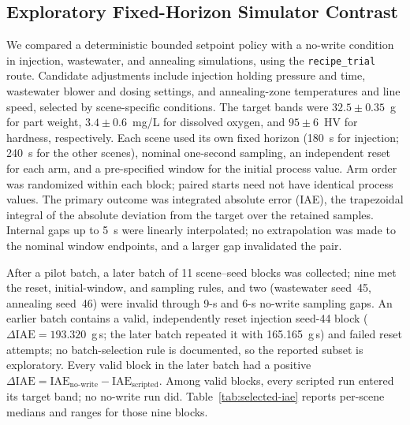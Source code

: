 \subsection{Exploratory Fixed-Horizon Simulator Contrast}
\label{sec:eval-optimization}
We compared a deterministic bounded setpoint policy with a no-write condition in injection, wastewater, and annealing simulations, using the \texttt{recipe\_trial} route. Candidate adjustments include injection holding pressure and time, wastewater blower and dosing settings, and annealing-zone temperatures and line speed, selected by scene-specific conditions. The target bands were $32.5\pm0.35$~g for part weight, $3.4\pm0.6$~mg/L for dissolved oxygen, and $95\pm6$~HV for hardness, respectively. Each scene used its own fixed horizon (180~s for injection; 240~s for the other scenes), nominal one-second sampling, an independent reset for each arm, and a pre-specified window for the initial process value. Arm order was randomized within each block; paired starts need not have identical process values. The primary outcome was integrated absolute error (IAE), the trapezoidal integral of the absolute deviation from the target over the retained samples. Internal gaps up to 5~s were linearly interpolated; no extrapolation was made to the nominal window endpoints, and a larger gap invalidated the pair.

After a pilot batch, a later batch of 11 scene--seed blocks was collected; nine met the reset, initial-window, and sampling rules, and two (wastewater seed~45, annealing seed~46) were invalid through 9-s and 6-s no-write sampling gaps. An earlier batch contains a valid, independently reset injection seed-44 block ($\Delta\mathrm{IAE}=193.320$~g\,s; the later batch repeated it with 165.165~g\,s) and failed reset attempts; no batch-selection rule is documented, so the reported subset is exploratory. Every valid block in the later batch had a positive $\Delta\mathrm{IAE}=\mathrm{IAE}_{\mathrm{no\text{-}write}}-\mathrm{IAE}_{\mathrm{scripted}}$. Among valid blocks, every scripted run entered its target band; no no-write run did. Table~\ref{tab:selected-iae} reports per-scene medians and ranges for those nine blocks.

